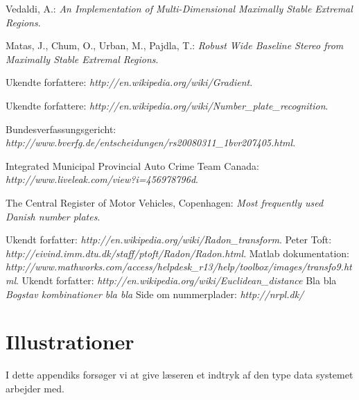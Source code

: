 \documentclass[11pt,a4paper,final]{article}
\begin{document}
\begin{thebibliography}{99}
 Vedaldi, A.: \textit{An Implementation of Multi-Dimensional Maximally Stable Extremal Regions}.

 Matas, J., Chum, O., Urban, M., Pajdla, T.: \textit{Robust Wide Baseline Stereo from Maximally Stable Extremal Regions}.

Ukendte forfattere: \textit{http://en.wikipedia.org/wiki/Gradient}.

 Ukendte forfattere: \textit{http://en.wikipedia.org/wiki/Number\_plate\_recognition}.

Bundesverfassungsgericht: \textit{http://www.bverfg.de/entscheidungen/rs20080311\_1bvr207405.html}.

Integrated Municipal Provincial Auto Crime Team Canada: \textit{http://www.liveleak.com/view?i=456978796d}.


 The Central Register of Motor Vehicles, Copenhagen: \textit{Most frequently used Danish number plates}.

 Ukendt forfatter: \textit{http://en.wikipedia.org/wiki/Radon\_transform}.
 Peter Toft: \textit{http://eivind.imm.dtu.dk/staff/ptoft/Radon/Radon.html}.
 Matlab dokumentation: \textit{http://www.mathworks.com/access/helpdesk\_r13/help/toolbox/images/transfo9.html}.
 Ukendt forfatter: \textit{http://en.wikipedia.org/wiki/Euclidean\_distance}
 Bla bla \textit{Bogstav kombinationer bla bla}
 Side om nummerplader: \textit{http://nrpl.dk/}


\end{thebibliography}

\appendix



\section{Illustrationer}
\label{sec:illu}
I dette appendiks forsøger vi at give læseren et indtryk af den type data systemet arbejder med.
\end{document}
